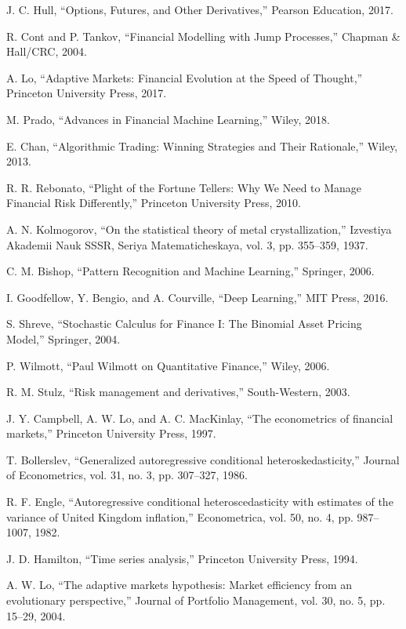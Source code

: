 \documentclass[conference]{IEEEtran}
\begin{document}
\begin{thebibliography}{00}
 J. C. Hull, ``Options, Futures, and Other Derivatives,'' Pearson Education, 2017.

 R. Cont and P. Tankov, ``Financial Modelling with Jump Processes,'' Chapman \& Hall/CRC, 2004.

 A. Lo, ``Adaptive Markets: Financial Evolution at the Speed of Thought,'' Princeton University Press, 2017.

 M. Prado, ``Advances in Financial Machine Learning,'' Wiley, 2018.

 E. Chan, ``Algorithmic Trading: Winning Strategies and Their Rationale,'' Wiley, 2013.

 R. R. Rebonato, ``Plight of the Fortune Tellers: Why We Need to Manage Financial Risk Differently,'' Princeton University Press, 2010.

 A. N. Kolmogorov, ``On the statistical theory of metal crystallization,'' Izvestiya Akademii Nauk SSSR, Seriya Matematicheskaya, vol. 3, pp. 355--359, 1937.

 C. M. Bishop, ``Pattern Recognition and Machine Learning,'' Springer, 2006.

 I. Goodfellow, Y. Bengio, and A. Courville, ``Deep Learning,'' MIT Press, 2016.

 S. Shreve, ``Stochastic Calculus for Finance I: The Binomial Asset Pricing Model,'' Springer, 2004.

 P. Wilmott, ``Paul Wilmott on Quantitative Finance,'' Wiley, 2006.

 R. M. Stulz, ``Risk management and derivatives,'' South-Western, 2003.

 J. Y. Campbell, A. W. Lo, and A. C. MacKinlay, ``The econometrics of financial markets,'' Princeton University Press, 1997.

 T. Bollerslev, ``Generalized autoregressive conditional heteroskedasticity,'' Journal of Econometrics, vol. 31, no. 3, pp. 307--327, 1986.

 R. F. Engle, ``Autoregressive conditional heteroscedasticity with estimates of the variance of United Kingdom inflation,'' Econometrica, vol. 50, no. 4, pp. 987--1007, 1982.

 J. D. Hamilton, ``Time series analysis,'' Princeton University Press, 1994.

 A. W. Lo, ``The adaptive markets hypothesis: Market efficiency from an evolutionary perspective,'' Journal of Portfolio Management, vol. 30, no. 5, pp. 15--29, 2004.


\end{thebibliography}
\end{document}
